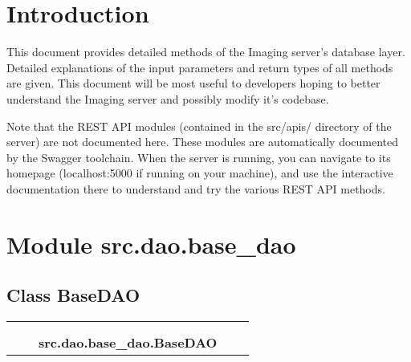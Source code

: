 %
%
%
\section{Introduction}
This document provides detailed methods of the Imaging server's database layer. Detailed 
explanations of the input parameters and return types of all methods are given. This document
will be most useful to developers hoping to better understand the Imaging server and possibly
modify it's codebase.

Note that the REST API modules (contained in the src/apis/ directory of the server) are not documented
here. These modules are automatically documented by the Swagger toolchain. When the server is running, you
can navigate to its homepage (localhost:5000 if running on your machine), and use the interactive
documentation there to understand and try the various REST API methods. 


\section{Module src.dao.base\_dao}

    \label{src:dao:base_dao}


\subsection{Class BaseDAO}

    \label{src:dao:base_dao:BaseDAO}
\begin{tabular}{cccccc}
\multicolumn{2}{r}{\settowidth{\BCL}{object}\multirow{2}{\BCL}{object}}
&&
  \\\cline{3-3}
  &&\multicolumn{1}{c|}{}
&&
  \\
&&\multicolumn{2}{l}{\textbf{src.dao.base\_dao.BaseDAO}}
\end{tabular}

